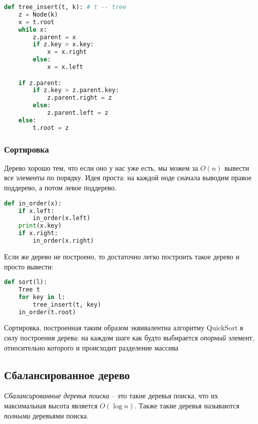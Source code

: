 \documentclass[../main.tex]{subfiles}
\begin{document}
	\begin{lstlisting}[language=python]
def tree_insert(t, k): # t -- tree
    z = Node(k)
    x = t.root
    while x:
        z.parent = x
        if z.key > x.key:
            x = x.right
        else:
            x = x.left

    if z.parent:
        if z.key > z.parent.key:
            z.parent.right = z
        else:
            z.parent.left = z
    else:
        t.root = z
	\end{lstlisting}
	
	
	\subsubsection{Сортировка}
	
	Дерево хорошо тем, что если оно у нас уже есть, мы можем за $O(n)$ вывести все элементы по порядку. Идея проста: на каждой ноде сначала выводим правое поддерево, а потом левое поддерево.
	
	\begin{lstlisting}[language=python]
def in_order(x):
    if x.left:
        in_order(x.left)
    print(x.key)
    if x.right:
	    in_order(x.right)
	\end{lstlisting}
	
	Если же дерево не построено, то достаточно легко построить такое дерево и просто вывести:
	
	\begin{lstlisting}[language=python]
def sort(l):
    Tree t
    for key in l:
        tree_insert(t, key)
    in_order(t.root)
	\end{lstlisting}
	
	\begin{remark}
		Сортировка, построенная таким образом эквивалентна алгоритму QuickSort в силу построения дерева: на каждом шаге как будто выбирается \textit{опорный} элемент, относительно которого и происходит разделение массива
	\end{remark}
	
	
	\subsection{Сбалансированное дерево}
	
	\begin{definition}
		\textit{Сбалансированные деревья поиска} -- это такие деревья поиска, что их максимальная высота является $O(\log n)$. Также такие деревья называются \textit{полными} деревьями поиска.
	\end{definition}
	
\end{document}
